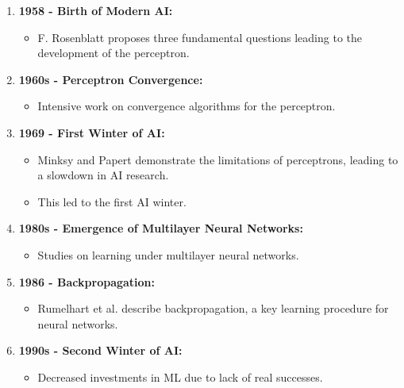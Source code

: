 \begin{frame}
{\begin{enumerate}
            \item \textbf{1958 - Birth of Modern AI:}
                  \begin{itemize}
                      \item F. Rosenblatt proposes three fundamental questions leading to the development of the perceptron.
                  \end{itemize}

            \item \textbf{1960s - Perceptron Convergence:}
                  \begin{itemize}
                      \item Intensive work on convergence algorithms for the perceptron.
                  \end{itemize}

            \item \textbf{1969 - First Winter of AI:}
                  \begin{itemize}
                      \item Minksy and Papert demonstrate the limitations of perceptrons, leading to a slowdown in AI research.
                      \item This led to the first AI winter.
                  \end{itemize}

            \item \textbf{1980s - Emergence of Multilayer Neural Networks:}
                  \begin{itemize}
                      \item Studies on learning under multilayer neural networks.
                  \end{itemize}

            \item \textbf{1986 - Backpropagation:}
                  \begin{itemize}
                      \item Rumelhart et al. describe backpropagation, a key learning procedure for neural networks.
                  \end{itemize}

            \item \textbf{1990s - Second Winter of AI:}
                  \begin{itemize}
                      \item Decreased investments in ML due to lack of real successes.
                  \end{itemize}


\end{enumerate}}
\end{frame}
